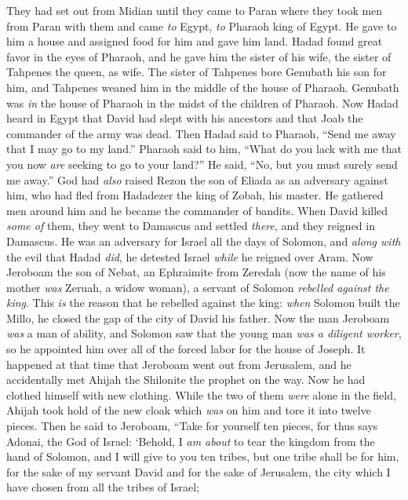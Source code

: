 \begin{biblechapter}
\verse They had set out from Midian until they came to Paran where they took men from Paran with them and came \textit{to} Egypt, \textit{to} Pharaoh king of Egypt. He gave to him a house and assigned food for him and gave him land.
\verse Hadad found great favor in the eyes of Pharaoh, and he gave him the sister of his wife, the sister of Tahpenes the queen, as wife.
\verse The sister of Tahpenes bore Genubath his son for him, and Tahpenes weaned him in the middle of the house of Pharaoh. Genubath was \textit{in} the house of Pharaoh in the midst of the children of Pharaoh.
\verse Now Hadad heard in Egypt that David had slept with his ancestors and that Joab the commander of the army was dead. Then Hadad said to Pharaoh, “Send me away that I may go to my land.”
\verse Pharaoh said to him, “What do you lack with me that you now \textit{are} seeking to go to your land?” He said, “No, but you must surely send me away.”
\verse God had \textit{also} raised Rezon the son of Eliada as an adversary against him, who had fled from Hadadezer the king of Zobah, his master.
\verse He gathered men around him and he became the commander of bandits. When David killed \textit{some of} them, they went to Damascus and settled \textit{there}, and they reigned in Damascus.
\verse He was an adversary for Israel all the days of Solomon, and \textit{along with} the evil that Hadad \textit{did}, he detested Israel \textit{while} he reigned over Aram.
 Now Jeroboam the son of Nebat, an Ephraimite from Zeredah (now the name of his mother \textit{was} Zeruah, a widow woman), a servant of Solomon \textit{rebelled against the king}.
\verse This \textit{is} the reason that he rebelled against the king: \textit{when} Solomon built the Millo, he closed the gap of the city of David his father.
\verse Now the man Jeroboam \textit{was} a man of ability, and Solomon saw that the young man \textit{was a diligent worker}, so he appointed him over all of the forced labor for the house of Joseph.
\verse It happened at that time that Jeroboam went out from Jerusalem, and he accidentally met Ahijah the Shilonite the prophet on the way. Now he had clothed himself with new clothing. While the two of them \textit{were} alone in the field,
\verse Ahijah took hold of the new cloak which \textit{was} on him and tore it into twelve pieces.
\verse Then he said to Jeroboam, “Take for yourself ten pieces, for thus says Adonai, the God of Israel: ‘Behold, I \textit{am about} to tear the kingdom from the hand of Solomon, and I will give to you ten tribes,
\verse but one tribe shall be for him, for the sake of my servant David and for the sake of Jerusalem, the city which I have chosen from all the tribes of Israel;

\end{biblechapter}
